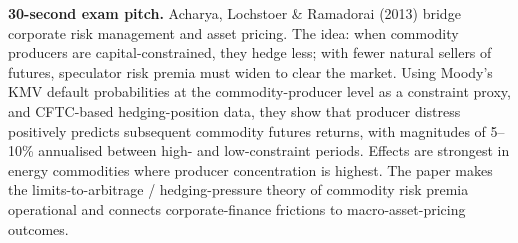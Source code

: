 \documentclass[11pt]{article}
\begin{document}
\begin{keybox}
\textbf{30-second exam pitch.} Acharya, Lochstoer \& Ramadorai (2013) bridge corporate risk management and asset pricing. The idea: when commodity producers are capital-constrained, they hedge less; with fewer natural sellers of futures, speculator risk premia must widen to clear the market. Using Moody's KMV default probabilities at the commodity-producer level as a constraint proxy, and CFTC-based hedging-position data, they show that producer distress positively predicts subsequent commodity futures returns, with magnitudes of 5--10\% annualised between high- and low-constraint periods. Effects are strongest in energy commodities where producer concentration is highest. The paper makes the limits-to-arbitrage / hedging-pressure theory of commodity risk premia operational and connects corporate-finance frictions to macro-asset-pricing outcomes.
\end{keybox}
\end{document}
